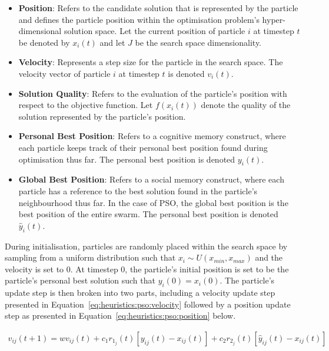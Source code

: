 \begin{itemize}
      \item \textbf{Position}: Refers to the candidate solution that is represented by the particle and defines the particle position within the optimisation problem's hyper-dimensional solution space. Let the current position of particle $i$ at timestep $t$ be denoted by $x_{i}(t)$ and let $J$ be the search space dimensionality.

      \item \textbf{Velocity}: Represents a step size for the particle in the search space. The velocity vector of particle $i$ at timestep $t$ is denoted $v_{i}(t)$.

      \item \textbf{Solution Quality}: Refers to the evaluation of the particle's position with respect to the objective function. Let $f(x_{i}(t))$ denote the quality of the solution represented by the particle's position.

      \item \textbf{Personal Best Position}: Refers to a cognitive memory construct, where each particle keeps track of their personal best position found during optimisation thus far. The personal best position is denoted $y_{i}(t)$.

      \item \textbf{Global Best Position}: Refers to a social memory construct, where each particle has a reference to the best solution found in the particle's neighbourhood thus far. In the case of  \acs{PSO}, the global best position is the best position of the entire swarm. The personal best position is denoted $\hat{y}_{i}(t)$.
\end{itemize}

\noindent
During initialisation, particles are randomly placed within the search space by sampling from a uniform distribution such that $x_{i} \sim U(x_{min}, x_{max})$ and the velocity is set to 0. At timestep 0, the particle's initial position is set to be the particle's personal best solution such that $y_{i}(0) = x_{i}(0)$. The particle's update step is then broken into two parts, including a velocity update step presented in Equation~\eqref{eq:heuristics:pso:velocity} followed by a position update step as presented in Equation~\eqref{eq:heuristics:pso:position} below.

\begin{equation}
      \label{eq:heuristics:pso:velocity}
      \begin{split}
            v_{ij}(t+1) = wv_{ij}(t) + c_{1}r_{1_{j}}(t)[y_{ij}(t) - x_{ij}(t)] + c_{2}r_{2_{j}}(t)[\hat{y}_{ij}(t) - x_{ij}(t)]
      \end{split}
\end{equation}


